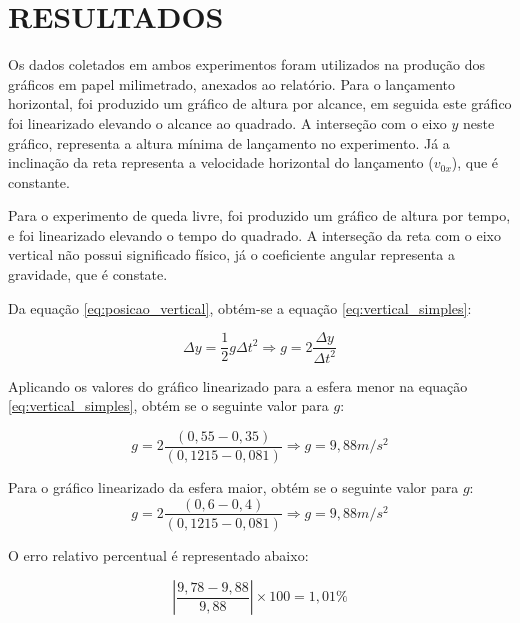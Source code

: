 \documentclass[10pt]{article}
\begin{document}
\section{RESULTADOS}

Os dados coletados em ambos experimentos foram utilizados na produção dos gráficos em papel milimetrado, anexados ao relatório. Para o lançamento horizontal, foi produzido um gráfico de altura por alcance, em seguida este gráfico foi linearizado elevando o alcance ao quadrado. A interseção com o eixo $y$ neste gráfico, representa a altura mínima de lançamento no experimento. Já a inclinação da reta representa a velocidade horizontal do lançamento ($v_{0x}$), que é constante. 

Para o experimento de queda livre, foi produzido um gráfico de altura por tempo, e foi linearizado elevando o tempo do quadrado. A interseção da reta com o eixo vertical não possui significado físico, já o coeficiente angular representa a gravidade, que é constate.

Da equação \ref{eq:posicao_vertical}, obtém-se a equação \ref{eq:vertical_simples}:

\begin{equation}
\Delta y = \frac{1}{2}g\Delta t^2 \Rightarrow g = 2\frac{\Delta y}{\Delta t^2}
\label{eq:vertical_simples}
\end{equation}

Aplicando os valores do gráfico linearizado para a esfera menor na equação \ref{eq:vertical_simples}, obtém se o seguinte valor para $g$:

\begin{equation}
g = 2\frac{(0,55-0,35)}{(0,1215-0,081)} \Rightarrow g = 9,88m/s^2
\label{eq:aceleracao_esfera1}
\end{equation}

Para o gráfico linearizado da esfera maior, obtém se o seguinte valor para $g$:
\begin{equation}
g = 2\frac{(0,6-0,4)}{(0,1215-0,081)} \Rightarrow g = 9,88m/s^2
\label{eq:aceleracao_esfera2}
\end{equation}

O erro relativo percentual é representado abaixo:

\begin{equation}
|\frac{9,78-9,88}{9,88}| \times 100 = 1,01\%
\end{equation}
\begin{equation}
\label{key}
\end{equation}
\end{document}
